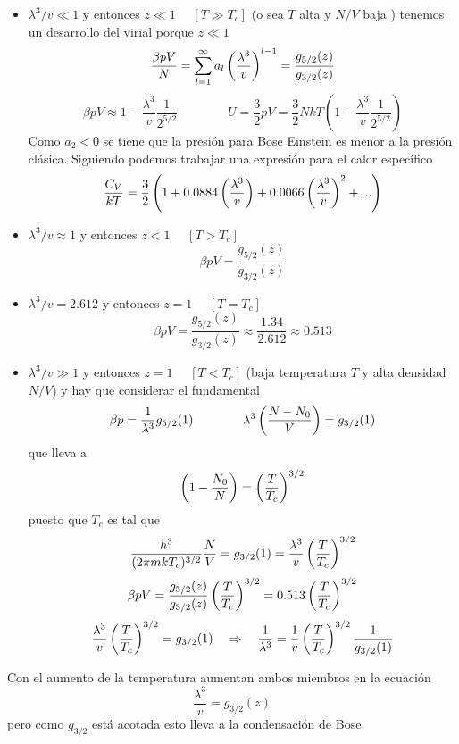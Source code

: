 \documentclass[10pt,oneside]{CBFT_book}
\begin{document}
\begin{itemize}
 \item $ \lambda^3 / v \ll 1 $ y entonces $ z \ll 1 $ $\quad  [T \gg T_c ] $ (o sea $T$ alta y $N/V$ baja )
 tenemos un desarrollo del virial porque $z \ll 1$
 \[
	\frac{\beta p V}{N} = \sum_{l=1}^\infty a_l \left( \frac{ \lambda^3 }{ v } \right)^{l-1} = \frac{ g_{5/2}(z) }{ g_{3/2}(z) }
 \]
 \[
	\beta p V \approx 1 - \frac{\lambda^3}{v} \frac{1}{2^{5/2}} \qquad \qquad 
	U = \frac{3}{2}pV = \frac{3}{2} NkT \left( 1 - \frac{\lambda^3}{v} \frac{1}{2^{5/2}} \right)
 \]
 Como $a_2 < 0$ se tiene que la presión para Bose Einstein es menor a la presión clásica. Siguiendo
 podemos trabajar una expresión para el calor específico
 \[
	\frac{C_V}{kT} = \frac{3}{2} \left( 1 + 0.0884 \left( \frac{ \lambda^3 }{ v } \right) + 
	0.0066 \left( \frac{ \lambda^3 }{ v } \right)^2 + ... \right)
 \]
 
 \item $ \lambda^3 / v \approx 1 $ y entonces $ z < 1 $ $\quad  [T > T_c ] $
 \[
	\beta p V = \frac{ g_{5/2}(z) }{ g_{3/2}(z) }
 \]
 \item  $ \lambda^3 / v = 2.612 $ y entonces $ z = 1 $ $\quad  [T = T_c ] $
 \[
	\beta p V = \frac{ g_{5/2}(z) }{ g_{3/2}(z) } \approx \frac{1.34}{2.612} \approx 0.513
 \]
 \item $ \lambda^3 / v \gg 1 $ y entonces $ z = 1 $ $\quad  [T < T_c ] $ (baja temperatura $T$ y alta
 densidad $N/V$) y hay que considerar el  fundamental
 \[
	\beta p = \frac{1}{\lambda^3} g_{5/2}(1) \qquad \qquad \lambda^3\left( \frac{ N-N_0 }{ V } \right) = g_{3/2}(1)
 \]
 que lleva a 
 \[
	\left( 1 - \frac{N_0}{N} \right) = \left( \frac{ T }{ T_c } \right)^{3/2}
 \]
 puesto que $T_c$ es tal que 
 \[
	\frac{h^3}{(2\pi m kT_c)^{3/2}} \frac{N}{V} = g_{3/2}(1) = \frac{\lambda^3}{v}\left( \frac{ T }{ T_c } \right)^{3/2}
 \]
 \[
	\beta p V = \frac{ g_{5/2}(z) }{ g_{3/2}(z) } \left( \frac{ T }{ T_c } \right)^{3/2} = 0.513 \left( \frac{ T }{ T_c } \right)^{3/2}
 \]
 \[
	\frac{\lambda^3}{v} \left( \frac{ T }{ T_c } \right)^{3/2} = g_{3/2}(1) \quad \Rightarrow \quad \frac{1}{\lambda^3} =
	\frac{1}{v}\left( \frac{ T }{ T_c } \right)^{3/2} \frac{1}{g_{3/2}(1)}
 \]
\end{itemize}

Con el aumento de la temperatura aumentan ambos miembros en la ecuación 
\[
	\frac{\lambda^3}{v} = g_{3/2}(z)
\]
pero como $g_{3/2}$ está acotada esto lleva a la condensación de Bose.
\end{document}
